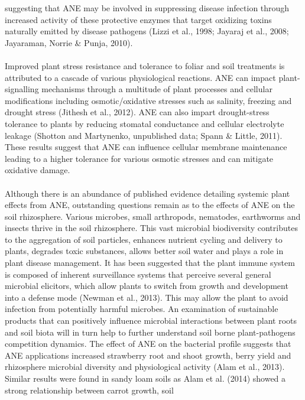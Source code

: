 \documentclass[11pt,]{article}
\begin{document}
suggesting that ANE may be involved in suppressing disease infection
through increased activity of these protective enzymes that target
oxidizing toxins naturally emitted by disease pathogens (Lizzi et al.,
1998; Jayaraj et al., 2008; Jayaraman, Norrie \& Punja, 2010).\\
\hspace*{0.333em}\\
Improved plant stress resistance and tolerance to foliar and soil
treatments is attributed to a cascade of various physiological
reactions. ANE can impact plant-signalling mechanisms through a
multitude of plant processes and cellular modifications including
osmotic/oxidative stresses such as salinity, freezing and drought stress
(Jithesh et al., 2012). ANE can also impart drought-stress tolerance to
plants by reducing stomatal conductance and cellular electrolyte leakage
(Shotton and Martynenko, unpublished data; Spann \& Little, 2011). These
results suggest that ANE can influence cellular membrane maintenance
leading to a higher tolerance for various osmotic stresses and can
mitigate oxidative damage.\\
\hspace*{0.333em}\\
Although there is an abundance of published evidence detailing systemic
plant effects from ANE, outstanding questions remain as to the effects
of ANE on the soil rhizosphere. Various microbes, small arthropods,
nematodes, earthworms and insects thrive in the soil rhizosphere. This
vast microbial biodiversity contributes to the aggregation of soil
particles, enhances nutrient cycling and delivery to plants, degrades
toxic substances, allows better soil water and plays a role in plant
disease management. It has been suggested that the plant immune system
is composed of inherent surveillance systems that perceive several
general microbial elicitors, which allow plants to switch from growth
and development into a defense mode (Newman et al., 2013). This may
allow the plant to avoid infection from potentially harmful microbes. An
examination of sustainable products that can positively influence
microbial interactions between plant roots and soil biota will in turn
help to further understand soil borne plant-pathogens competition
dynamics. The effect of ANE on the bacterial profile suggests that ANE
applications increased strawberry root and shoot growth, berry yield and
rhizosphere microbial diversity and physiological activity (Alam et al.,
2013). Similar results were found in sandy loam soils as Alam et al.
(2014) showed a strong relationship between carrot growth, soil
\end{document}
